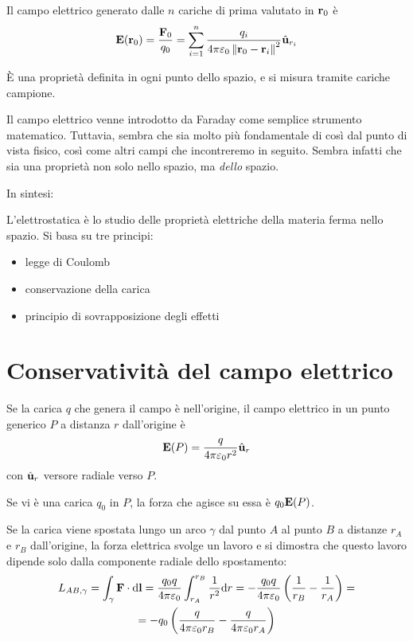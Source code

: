 Il campo elettrico generato dalle $n$ cariche di prima valutato in $\mathbf{r}_0$ è
\begin{equation}
    \mathbf{E}(\mathbf{r}_0) = \frac{\mathbf{F}_0}{q_0} = \sum_{i=1}^n \frac{q_i}{4 \pi \varepsilon_0 \left\lVert \mathbf{r}_0 - \mathbf{r}_i \right\rVert^2} \hat{\mathbf{u}}_{r_i}
\end{equation}

È una proprietà definita in ogni punto dello spazio, e si misura tramite cariche campione.

Il campo elettrico venne introdotto da Faraday come semplice strumento matematico.
Tuttavia, sembra che sia molto più fondamentale di così dal punto di vista fisico, così come altri campi che incontreremo in seguito.
Sembra infatti che sia una proprietà non solo nello spazio, ma \textit{dello} spazio.

In sintesi:

L'elettrostatica è lo studio delle proprietà elettriche della materia ferma nello spazio.
Si basa su tre principi:
\begin{itemize}
    \item legge di Coulomb
    \item conservazione della carica
    \item principio di sovrapposizione degli effetti
\end{itemize}

\section{Conservatività del campo elettrico}

Se la carica $q$ che genera il campo è nell'origine, il campo elettrico in un punto generico $P$ a distanza $r$ dall'origine è
\begin{equation}
    \mathbf{E}(P) = \frac{q}{4\pi\varepsilon_0 r^2} \hat{\mathbf{u}}_{r}
\end{equation}
con $\hat{\mathbf{u}}_{r}$ versore radiale verso $P$.

Se vi è una carica $q_0$ in $P$, la forza che agisce su essa è $q_0 \mathbf{E}(P)$.

Se la carica viene spostata lungo un arco $\gamma$ dal punto $A$ al punto $B$ a distanze $r_A$ e $r_B$ dall'origine, la forza elettrica svolge un lavoro e si dimostra che questo lavoro dipende solo dalla componente radiale dello spostamento:
\begin{equation}
\label{eq:potenziale_elettrostatico}
    \begin{gathered}
        L_{AB, \gamma} = \int_\gamma \mathbf{F} \cdot \mathrm{d} \mathbf{l} = \frac{q_0 q}{4\pi \varepsilon_0} \int_{r_A}^{r_B} \frac{1}{r^2} \mathrm{d} r = - \frac{q_0 q}{4\pi \varepsilon_0} \left( \frac{1}{r_B} - \frac{1}{r_A} \right) = \\
        = -q_0 \left( \frac{q}{4\pi \varepsilon_0 r_B} - \frac{q}{4\pi \varepsilon_0 r_A} \right)
    \end{gathered}
\end{equation}

